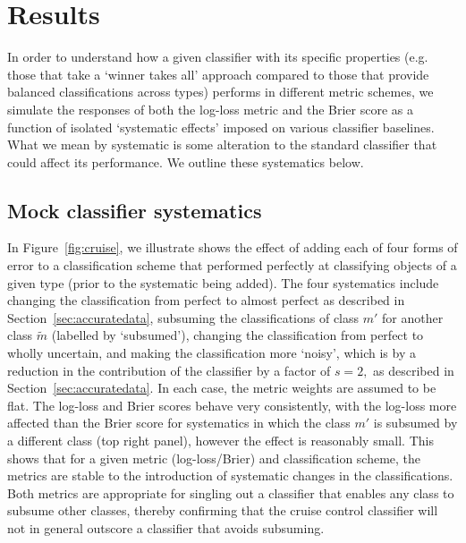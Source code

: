 \section{Results}
\label{sec:results}
In order to understand how a given classifier with its specific properties (e.g. those that take a `winner takes all' approach compared to those that provide balanced classifications across types) performs in different metric schemes, we simulate the responses of both the log-loss metric and the Brier score as a function of isolated `systematic effects' imposed on various classifier baselines.
What we mean by systematic is some alteration to the standard classifier that could affect its performance.  We outline these systematics below.

\subsection{Mock classifier systematics}
\label{sec:mockresults}

In Figure~\ref{fig:cruise}, we illustrate shows the effect of adding each of four forms of error to a classification scheme that performed perfectly at classifying objects of a given type (prior to the systematic being added).
The four systematics include changing the classification from perfect to almost perfect as described in Section~\ref{sec:accuratedata}, subsuming the classifications of class $m'$ for another class $\tilde{m}$ (labelled by `subsumed'), changing the classification from perfect to wholly uncertain, and making the classification more `noisy', which is by a reduction in the contribution of the classifier by a factor of $s=2,$ as described in Section~\ref{sec:accuratedata}.
In each case, the metric weights are assumed to be flat.
The log-loss and Brier scores behave very consistently, with the log-loss more affected than the Brier score for systematics in which the class $m'$ is subsumed by a different class (top right panel), however the effect is reasonably small.
This shows that for a given metric (log-loss/Brier) and classification scheme, the metrics are stable to the introduction of systematic changes in the classifications.
Both metrics are appropriate for singling out a classifier that enables any class to subsume other classes, thereby confirming that the cruise control classifier will not in general outscore a classifier that avoids subsuming.

